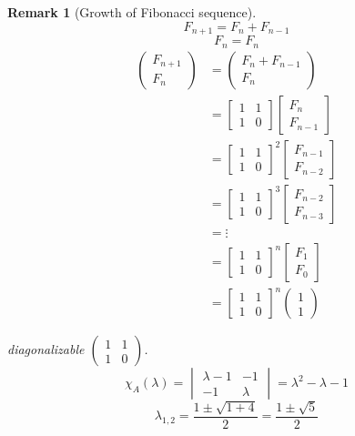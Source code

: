\documentclass{article}
\newtheorem{remark}{Remark}  \numberwithin{remark}{section}
\newcommand{\vectwo}[2]{\begin{pmatrix} #1 \\ #2 \end{pmatrix}}
\begin{document}
\begin{remark}[Growth of Fibonacci sequence]
  \[ F_{n+1} = F_n + F_{n-1} \]
  \[ F_n = F_n \]
  \begin{align*}
    \vectwo{F_{n+1}}{F_n}
      &= \vectwo{F_n + F_{n-1}}{F_n} \\
      &= \begin{bmatrix} 1 & 1 \\ 1 & 0 \end{bmatrix} \begin{bmatrix} F_n \\ F_{n-1} \end{bmatrix} \\
      &= \begin{bmatrix} 1 & 1 \\ 1 & 0 \end{bmatrix}^2 \begin{bmatrix} F_{n-1} \\ F_{n-2} \end{bmatrix} \\
      &= \begin{bmatrix} 1 & 1 \\ 1 & 0 \end{bmatrix}^3 \begin{bmatrix} F_{n-2} \\ F_{n-3} \end{bmatrix} \\
      &= \vdots \\
      &= \begin{bmatrix} 1 & 1 \\ 1 & 0 \end{bmatrix}^n \begin{bmatrix} F_1 \\ F_0 \end{bmatrix} \\
      &= \begin{bmatrix} 1 & 1 \\ 1 & 0 \end{bmatrix}^n \vectwo11
  \end{align*}

  diagonalizable $\begin{pmatrix} 1 & 1 \\ 1 & 0 \end{pmatrix}$.
  \[
    \chi_A(\lambda) = \begin{vmatrix}
      \lambda-1 & -1 \\
      -1 & \lambda
    \end{vmatrix} = \lambda^2 - \lambda - 1
  \] \[
    \lambda_{1,2} = \frac{1 \pm \sqrt{1 + 4}}{2} = \frac{1 \pm \sqrt{5}}{2}
  \]


\end{remark}
\end{document}
